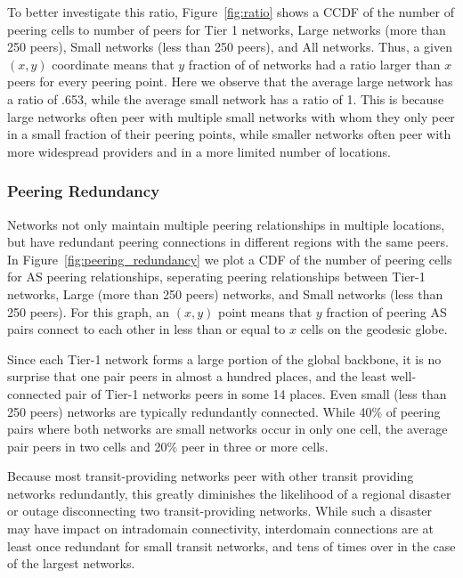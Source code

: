     To better investigate this ratio, Figure~\ref{fig:ratio} shows a CCDF of the number of peering cells to number of peers for Tier 1 networks, Large networks (more than 250 peers), Small networks (less than 250 peers), and All networks. 
    Thus, a given $(x,y)$ coordinate means that $y$ fraction of of networks had a ratio larger than $x$ peers for every peering point.
    Here we observe that the average large network has a ratio of .653, while the average small network has a ratio of 1.
    This is because large networks often peer with multiple small networks with whom they only peer in a small fraction of their peering points, while smaller networks often peer with more widespread providers and in a more limited number of locations.

\subsubsection*{Peering Redundancy}
    Networks not only maintain multiple peering relationships in multiple locations, but have redundant peering connections in different regions with the same peers.
    In Figure~\ref{fig:peering_redundancy} we plot a CDF of the number of peering cells for AS peering relationships, seperating peering relationships between Tier-1 networks, Large (more than 250 peers) networks, and Small networks (less than 250 peers).
    For this graph, an $(x,y)$ point means that $y$ fraction of peering AS pairs connect to each other in less than or equal to $x$ cells on the geodesic globe.

    Since each Tier-1 network forms a large portion of the global backbone, it is no surprise that one pair peers in almost a hundred places, and the least well-connected pair of Tier-1 networks peers in some 14 places.
    Even small (less than 250 peers) networks are typically redundantly connected. 
    While 40\% of peering pairs where both networks are small networks occur in only one cell, the average pair peers in two cells and 20\% peer in three or more cells. 

    Because most transit-providing networks peer with other transit providing networks redundantly, this greatly diminishes the likelihood of a regional disaster or outage disconnecting two transit-providing networks.
    While such a disaster may have impact on intradomain connectivity, interdomain connections are at least once redundant for small transit networks, and tens of times over in the case of the largest networks.


